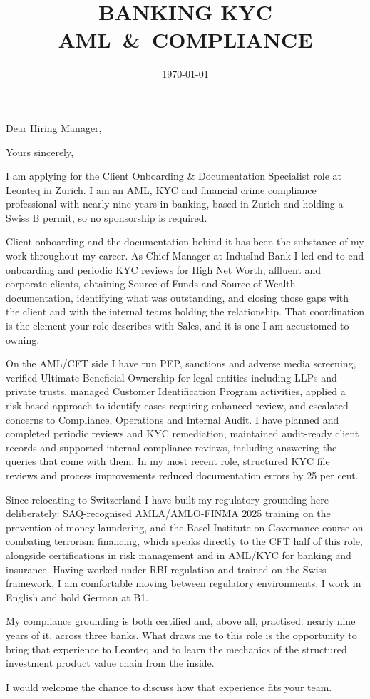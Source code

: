 \documentclass[11pt,a4paper,sans]{moderncv}
\title{BANKING \textbar{} KYC \textbar{} \mbox{AML \& COMPLIANCE}}
\begin{document}
\date{\today}
\opening{Dear Hiring Manager,}
\closing{Yours sincerely,}

\makelettertitle

I am applying for the Client Onboarding \& Documentation Specialist role at
Leonteq in Zurich. I am an AML, KYC and financial crime compliance professional with
nearly nine years in banking, based in Zurich and holding a Swiss B permit, so
no sponsorship is required.

Client onboarding and the documentation behind it has been the substance of my
work throughout my career. As Chief Manager at IndusInd Bank I led end-to-end
onboarding and periodic KYC reviews for High Net Worth, affluent and corporate
clients, obtaining Source of Funds and Source of Wealth documentation,
identifying what was outstanding, and closing those gaps with the client and
with the internal teams holding the relationship. That coordination is the
element your role describes with Sales, and it is one I am accustomed to
owning.

On the AML/CFT side I have run PEP, sanctions and adverse media screening,
verified Ultimate Beneficial Ownership for legal entities including LLPs and
private trusts, managed Customer Identification Program activities, applied a
risk-based approach to identify cases requiring enhanced review, and escalated
concerns to Compliance, Operations and Internal Audit. I have planned and
completed periodic reviews and KYC remediation, maintained audit-ready client
records and supported internal compliance reviews, including answering the
queries that come with them. In my most recent role, structured KYC
file reviews and process improvements reduced documentation errors by 25 per
cent.

Since relocating to Switzerland I have built my regulatory grounding here
deliberately: SAQ-recognised AMLA/AMLO-FINMA 2025 training on the prevention of
money laundering, and the Basel Institute on Governance course on combating
terrorism financing, which speaks directly to the CFT half of this role,
alongside certifications in risk management and in AML/KYC for banking and
insurance. Having worked under RBI regulation and trained on the Swiss
framework, I am comfortable moving between regulatory environments. I work in
English and hold German at B1.

My compliance grounding is both certified and, above all, practised: nearly
nine years of it, across three banks. What draws me to this role is the
opportunity to bring that experience to Leonteq and to learn the mechanics of
the structured investment product value chain from the inside.

I would welcome the chance to discuss how that experience fits your team.

\makeletterclosing
\end{document}
